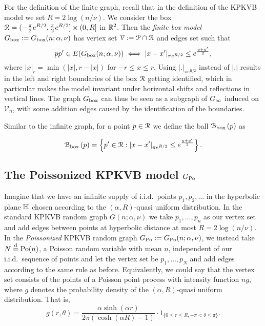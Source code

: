 For the definition of the finite graph, recall that in the definition of the KPKVB model we set $R = 2\log(n/\nu)$.
We consider the box ${\mathcal R} = (-\frac{\pi}{2}e^{R/2}, \frac{\pi}{2}e^{R/2}] \times (0, R]$ in ${\mathbb R}^2$. 
Then the \emph{finite box model} $G_{\text{box}} := G_{\text{box}}(n;\alpha, \nu)$ has vertex set $\mathcal{V} := \mathcal{P} \cap {\mathcal R}$ and edges set such that
\[
	pp' \in E(G_{\text{box}}(n;\alpha, \nu)) \iff |x - x'|_{\pi e^{R/2}} \leq e^{\frac{y + y'}{2}},
\]
where $|x|_{r} = \min( |x|, r - |x|)$ for $-r\leq x\leq r$. 
Using $|.|_{\pi e^{R/2}}$ instead of $|.|$ results in the left and right boundaries of the box ${\mathcal R}$ getting 
identified, which in particular 
makes the model invariant under horizontal shifts and reflections in vertical lines. 
The graph $G_{\text{box}}$ can thus be seen as a subgraph of $G_{\infty}$ induced on $\mathcal{V}_n$, with some addition edges caused by 
the identification of the boundaries.

Similar to the infinite graph, for a point $p \in {\mathcal R}$ we define the ball ${\mathcal B}_{\text{box}}\left(p\right)$ as

\begin{equation}\label{eq:def_ball_P_n}
	{\mathcal B}_{\text{box}}\left(p\right) = 
	\left\{p' \in {\mathcal R} : |x - x'|_{\pi e^{R/2}} \leq e^{\frac{y + y'}{2}}\right\}.
\end{equation}


\subsection{The Poissonized KPKVB model $G_{\text{Po}}$}


Imagine that we have an infinite supply of i.i.d.~points $p_1, p_2, \dots$ in the hyperbolic plane ${\mathbb H}$ chosen according to the $(\alpha, R)$-quasi uniform distribution. In the standard KPKVB random graph $G(n;\alpha,\nu)$ we take $p_1,\dots, p_n$ as our vertex set and add edges between points at hyperbolic distance at most $R = 2\log(n/\nu)$. In the {\em Poissonized} KPKVB random graph $G_{\text{Po}} := G_{\text{Po}}(n;\alpha,\nu)$, we instead take $N\stackrel{\text{d}}{=} {\mathrm{Po}}(n)$, a Poisson random variable 
with mean $n$, independent of our i.i.d.~sequence of points and let the vertex set be $p_1,\dots, p_N$ and add edges 
according to the same rule as before. Equivalently, we could say that the vertex set consists of the points of a Poisson point process with intensity function $n g$, where $g$ denotes the probability density of the $(\alpha,R)$-quasi uniform distribution. That is,
\[
	g(r,\theta) = \frac{\alpha\sinh(\alpha r)}{2\pi(\cosh(\alpha R) - 1)} \cdot 1_{\{0\leq r\leq R, -\pi<\theta\leq \pi\}}.
\] 

